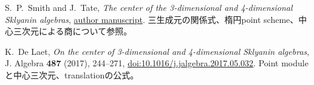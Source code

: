 S.~P.~Smith and J.~Tate,
\emph{The center of the 3-dimensional and 4-dimensional Sklyanin algebras},
\href{https://sites.math.washington.edu/~smith/Research/tate.pdf}{author manuscript}.
三生成元の関係式、楕円point scheme、中心三次元による商について参照。

K.~De Laet,
\emph{On the center of 3-dimensional and 4-dimensional Sklyanin algebras},
J. Algebra \textbf{487} (2017), 244--271,
\href{https://doi.org/10.1016/j.jalgebra.2017.05.032}{doi:10.1016/j.jalgebra.2017.05.032}.
Point moduleと中心三次元、translationの公式。

